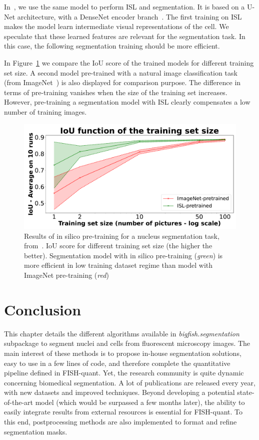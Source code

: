 In~\cite{Bonte_2022}, we use the same model to perform \ac{ISL} and segmentation.
It is based on a U-Net architecture, with a DenseNet encoder branch~\cite{Huang_2017_CVPR}.
The first training on \ac{ISL} makes the model learn intermediate visual representations of the cell.
We speculate that these learned features are relevant for the segmentation task.
In this case, the following segmentation training should be more efficient.

In Figure~\ref{fig:results_insilico} we compare the \ac{IoU} score of the trained models for different training set size.
A second model pre-trained with a natural image classification task (from ImageNet~\cite{Deng_2009}) is also displayed for comparison purpose.
The difference in terms of pre-training vanishes when the size of the training set increases.
However, pre-training a segmentation model with \ac{ISL} clearly compensates a low number of training images.

\begin{figure}[]
    \centering
    \includegraphics[width=\textwidth]{figures/chapter3/insilico_training_size}
    \caption[Results of in silico pre-training]{Results of in silico pre-training for a nucleus segmentation task, from~\cite{Bonte_2022}.
	IoU score for different training set size (the higher the better).
	Segmentation model with in silico pre-training (\textit{green}) is more efficient in low training dataset regime than model with ImageNet pre-training (\textit{red})}
    \label{fig:results_insilico}
\end{figure}

\section{Conclusion}
\label{sec:segmentation_conclusion}

This chapter details the different algorithms available in \emph{bigfish.segmentation} subpackage to segment nuclei and cells from fluorescent microscopy images.
The main interest of these methods is to propose in-house segmentation solutions, easy to use in a few lines of code, and therefore complete the quantitative pipeline defined in FISH-quant.
Yet, the research community is quite dynamic concerning biomedical segmentation.
A lot of publications are released every year, with new datasets and improved techniques.
Beyond developing a potential state-of-the-art model (which would be surpassed a few months later), the ability to easily integrate results from external resources is essential for FISH-quant.
To this end, postprocessing methods are also implemented to format and refine segmentation masks.

